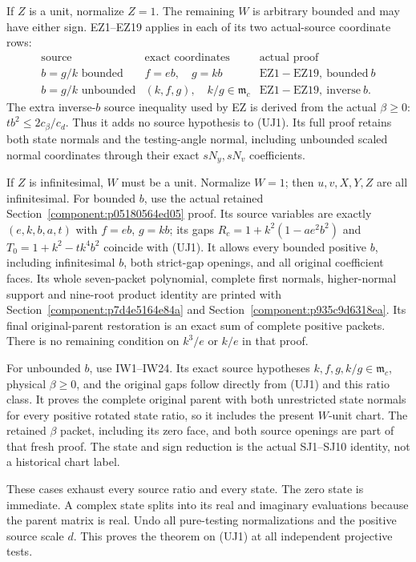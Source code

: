 If $Z$ is a unit, normalize $Z=1$. The remaining $W$ is arbitrary
bounded and may have either sign. EZ1--EZ19 applies in each of
its two actual-source coordinate rows:
\[
\begin{array}{c|c|c}
 \text{source}&\text{exact coordinates}&\text{actual proof}\\ \hline
 b=g/k\text{ bounded}& f=eb,\quad g=kb&
                     \mathrm{EZ1\!-\!EZ19,\ bounded\ }b\\
 b=g/k\text{ unbounded}&
        (k,f,g),\quad k/g\in\mathfrak m_c&
                     \mathrm{EZ1\!-\!EZ19,\ inverse\ }b.
\end{array}                                                     \tag{UJ5}
\]
The extra inverse-$b$ source inequality used by EZ is derived from
the actual $\beta\geq0$: $tb^2\leq2c_\beta/c_d$. Thus it adds no
source hypothesis to (UJ1). Its full proof retains both state
normals and the testing-angle normal, including unbounded scaled
normal coordinates through their exact $sN_y,sN_v$ coefficients.

If $Z$ is infinitesimal, $W$ must be a unit. Normalize $W=1$;
then $u,v,X,Y,Z$ are all infinitesimal.
For bounded $b$, use the actual retained
Section~\ref{component:p05180564ed05} proof. Its source variables are exactly
$(e,k,b,a,t)$ with $f=eb$, $g=kb$; its gaps
$R_c=1+k^2(1-ae^2b^2)$ and
$T_0=1+k^2-tk^4b^2$ coincide with (UJ1).
It allows every bounded positive $b$, including infinitesimal $b$,
both strict-gap openings, and all original coefficient faces.
Its whole seven-packet polynomial, complete first normals,
higher-normal support and nine-root product identity are printed
with Section~\ref{component:p7d4e5164e84a} and
Section~\ref{component:p935c9d6318ea}. Its final original-parent
restoration is an exact sum of complete positive packets.
There is no remaining condition on $k^3/e$ or $k/e$ in that proof.

For unbounded $b$, use IW1--IW24. Its exact source hypotheses
$k,f,g,k/g\in\mathfrak m_c$, physical $\beta\geq0$, and the
original gaps follow directly from (UJ1) and this ratio class.
It proves the complete original parent with both unrestricted
state normals for every positive rotated state ratio, so it
includes the present $W$-unit chart. The retained $\beta$ packet,
including its zero face, and both source openings are part of
that fresh proof. The state and sign reduction is the actual
SJ1--SJ10 identity, not a historical chart label.

These cases exhaust every source ratio and every state.
The zero state is immediate. A complex state splits into its
real and imaginary evaluations because the parent matrix is real.
Undo all pure-testing normalizations and the positive source
scale $d$. This proves the theorem on (UJ1) at all independent
projective tests.


